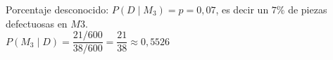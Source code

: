 \documentclass[11pt]{article}
\begin{document}
\begin{sol}
\begin{resp}
Porcentaje desconocido: $P(D\mid M_3)=p=0,07$, es decir un $7\%$ de piezas defectuosas en $M3$.\\
$P(M_3\mid D)=\dfrac{21/600}{38/600}=\dfrac{21}{38}\approx 0,5526$
\end{resp}

\end{sol}
\end{document}
